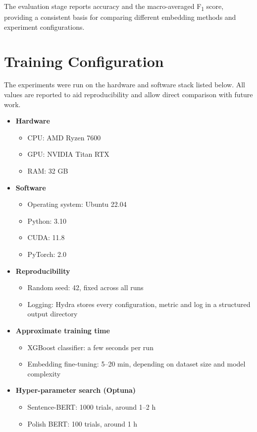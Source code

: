 \documentclass{SGGW-thesis-EN}
\begin{document}
The evaluation stage reports accuracy and the macro-averaged F\textsubscript{1} score, providing a consistent basis for
comparing different embedding methods and experiment configurations.


\section{Training Configuration}
The experiments were run on the hardware and software stack listed below. All values are reported to aid reproducibility
and allow direct comparison with future work.

\begin{itemize}
  \item \textbf{Hardware}
        \begin{itemize}
          \item CPU: AMD Ryzen 7600
          \item GPU: NVIDIA Titan RTX
          \item RAM: 32 GB
        \end{itemize}

  \item \textbf{Software}
        \begin{itemize}
          \item Operating system: Ubuntu 22.04
          \item Python: 3.10
          \item CUDA: 11.8
          \item PyTorch: 2.0
        \end{itemize}

  \item \textbf{Reproducibility}
        \begin{itemize}
          \item Random seed: 42, fixed across all runs
          \item Logging: Hydra stores every configuration, metric and log in a structured output directory
        \end{itemize}

  \item \textbf{Approximate training time}
        \begin{itemize}
          \item XGBoost classifier: a few seconds per run
          \item Embedding fine-tuning: 5–20 min, depending on dataset size and model complexity
        \end{itemize}

  \item \textbf{Hyper-parameter search (Optuna)}
        \begin{itemize}
          \item Sentence-BERT: 1000 trials, around 1–2 h
          \item Polish BERT: 100 trials, around 1 h
        \end{itemize}
\end{itemize}
\end{document}
